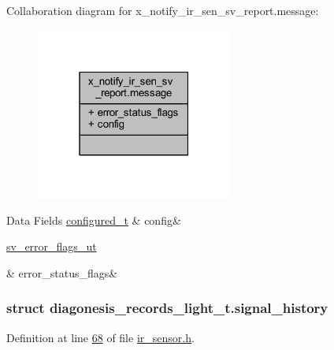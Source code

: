Collaboration diagram for x\+\_\+notify\+\_\+ir\+\_\+sen\+\_\+sv\+\_\+report.\+message\+:\nopagebreak
\begin{figure}[H]
\begin{center}
\leavevmode
\includegraphics[width=183pt]{d0/ddf/a00918}
\end{center}
\end{figure}
\begin{DoxyFields}{Data Fields}
\hypertarget{a00017_a2245023265ae4cf87d02c8b6ba991139}{\hyperlink{a00021_d6/d9c/a00352}{configured\+\_\+t}}\label{a00017_a2245023265ae4cf87d02c8b6ba991139}
&
config&
\\
\hline

\hypertarget{a00017_a150dd23606edacb55873c2c2cd06807d}{\hyperlink{a00022_d2/d5a/a00792}{sv\+\_\+error\+\_\+flags\+\_\+ut}}\label{a00017_a150dd23606edacb55873c2c2cd06807d}
&
error\+\_\+status\+\_\+flags&
\\
\hline

\end{DoxyFields}
\label{d8/d95/a00379}
\hypertarget{a00017_d8/d95/a00379}{}
\subsubsection{struct diagonesis\+\_\+records\+\_\+light\+\_\+t.\+signal\+\_\+history}


Definition at line \hyperlink{a00017_source_l00068}{68} of file \hyperlink{a00017_source}{ir\+\_\+sensor.\+h}.



